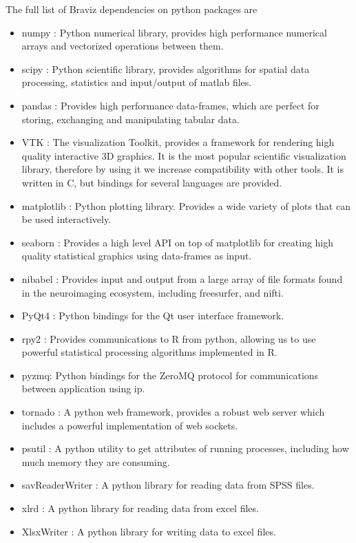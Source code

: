 The full list of Braviz dependencies on python packages are

\begin{itemize}
\item numpy \autocite{van_der_walt_numpy_2011}: Python numerical library, provides high performance numerical arrays and vectorized operations between them.
\item scipy \autocite{jones_scipy:_2001}: Python scientific library, provides algorithms for spatial data processing, statistics and input/output of matlab files.
\item pandas \autocite{mckinney_data_2010}: Provides high performance data-frames, which are perfect for storing, exchanging and manipulating tabular data.
\item VTK \autocite{schroeder_vtk_1998} : The visualization Toolkit, provides a framework for rendering high quality interactive 3D graphics. It is the most popular scientific visualization library, therefore by using it we increase compatibility with other tools. It is written in C, but bindings for several languages are provided.
\item matplotlib \autocite{hunter_matplotlib:_2007} : Python plotting library. Provides a wide variety of plots that can be used interactively. 
\item seaborn \autocite{michael_waskom_seaborn:_2015} : Provides a high level API on top of matplotlib for creating high quality statistical graphics using data-frames as input. 
\item nibabel \autocite{brett_neuroimaging_2006} : Provides input and output from a large array of file formats found in the neuroimaging ecosystem, including freesurfer, and nifti.
\item PyQt4 : Python bindings for the Qt user interface framework. 
\item rpy2  \autocite{gautier_rpy2:_2008} : Provides communications to R \autocite{team_r:_2012} from python, allowing us to use powerful statistical processing algorithms implemented in R. 
\item pyzmq: Python bindings for the ZeroMQ \autocite{hintjens_zeromq:_2013} protocol for communications between application using ip.
\item tornado : A python web framework, provides a robust web server which includes a powerful implementation of web sockets. 
\item psutil : A python utility to get attributes of running processes, including how much memory they are consuming.
\item savReaderWriter : A python library for reading data from SPSS files.
\item xlrd : A python library for reading data from excel files.
\item XlsxWriter : A python library for writing data to excel files.
\end{itemize}

